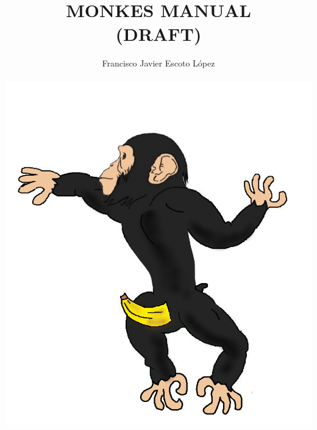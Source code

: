 \documentclass[twoside,11pt,english2 ]{article}
\title{\huge \textsc{MONKES MANUAL} \\ (DRAFT) }
\author{Francisco Javier Escoto L\'opez\\ \\ \includegraphics[scale=0.35]{figures/chad_MONKE}}
\date{}
\begin{document}
 
	\maketitle

\newpage
\tableofcontents

\newcommand{\uu}{\vb*{u}}
\newcommand{\vv}{\vb*{v}}
\newcommand{\ww}{\vb*{w}}
\newcommand{\zz}{\vb*{z}}
\newcommand{\FF}{\vb*{F}}
\newcommand{\GG}{\vb*{G}}
\newcommand{\HH}{\vb*{H}}	
\newcommand{\OO}{\mathcal{O}}
%

\newcommand{\fix}[1]{\mbox{fix}\left(#1\right)}
\newcommand{\MONKES}{\texttt{MONKES}}
\newcommand{\per}[1]{\mbox{per}\left(#1\right)}
 
 \newpage
  
 
 
 
 
 
 \appendix 
  
 
 \printbibliography
\end{document}
